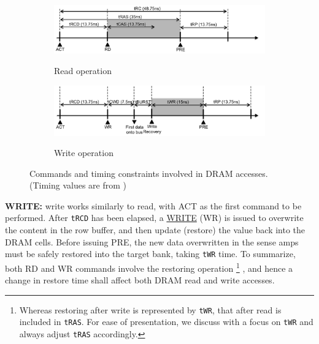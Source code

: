 \begin{figure}
 \centering
  \begin{subfigure}{.7\textwidth}
    \centering
    	\includegraphics[width=\linewidth]{figures/timing_read.pdf}\\
    \caption{Read operation}
    \label{fig:dram_read}
  \end{subfigure}

\vspace{-0.25in}
  \begin{subfigure}{.7\textwidth}
    \centering
    	\includegraphics[width=\linewidth]{figures/timing_write.pdf}\\
    \caption{Write operation}
    \label{fig:dram_write}
  \end{subfigure}
  \vspace{-0.4in}
  \caption{Commands and timing constraints involved in DRAM accesses. (Timing values are from  \cite{JEDEC:ddr3})}
  \label{fig:operation}
    \vspace{-0.45in}
\end{figure}

\textbf{WRITE:} write works similarly to read, with ACT as the first command to be performed. After {\tt tRCD} has been elapsed, a \underline{WRITE} (WR) is issued to overwrite the content in the row buffer, and then update (restore) the value back into the DRAM cells. Before issuing PRE, the new data overwritten in the sense amps must be safely restored into the target bank, taking {\tt tWR} time. 
To summarize, both RD and WR commands involve the restoring operation
\footnote{Whereas restoring after write is represented by {\tt tWR}, that after read is included in {\tt tRAS}. For ease of presentation, we discuss with a focus on {\tt tWR} and always adjust {\tt tRAS} accordingly.}
, and hence a change in restore time shall affect both DRAM read and write accesses. 

